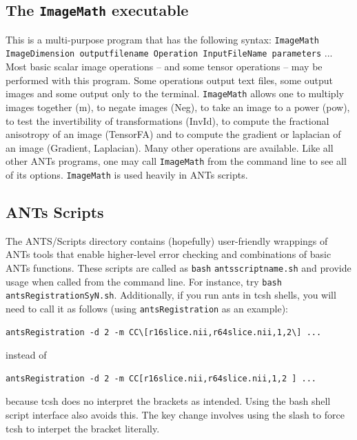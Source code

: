 \documentclass{InsightArticle}
\begin{document}
\subsection{The \texttt{ImageMath} executable} This is a multi-purpose program
that has the following syntax:  \texttt{ImageMath ImageDimension
outputfilename   Operation  InputFileName  parameters} ...  Most basic
scalar image operations -- and some tensor operations -- may be
performed with this program.  Some operations output text files, some
output images and some output only to the terminal.   \texttt{ImageMath} allows
one to multiply images together (m), to negate images (Neg), to take
an image to a power (pow), to test the invertibility of
transformations (InvId), to compute the fractional anisotropy of an
image (TensorFA) and to compute the gradient or laplacian of an image
(Gradient, Laplacian).   Many other operations are available.  Like all other ANTs programs, one may call \texttt{ImageMath} from the command line to see all of its options.   \texttt{ImageMath} is used heavily in ANTs scripts.  

\subsection{ANTs Scripts} 
The ANTS/Scripts directory contains (hopefully) user-friendly
wrappings of ANTs tools that enable higher-level error checking and
combinations of basic ANTs functions.  These scripts are called as
\texttt{bash}  \texttt{antsscriptname.sh}  and provide usage when called
from the command line.  For instance, try \texttt{bash}  \texttt{antsRegistrationSyN.sh}.
Additionally, if you run ants in tcsh shells, you will need to call it
as follows (using \texttt{antsRegistration} as an example):
\begin{verbatim}
antsRegistration -d 2 -m CC\[r16slice.nii,r64slice.nii,1,2\] ...
\end{verbatim}
instead of
\begin{verbatim}
antsRegistration -d 2 -m CC[r16slice.nii,r64slice.nii,1,2 ] ...
\end{verbatim}
because tcsh does no interpret the brackets as intended.  Using the
bash shell script interface also avoids this.  The key change involves using the slash to force tcsh to 
interpet the bracket literally. 
\newpage
\end{document}
